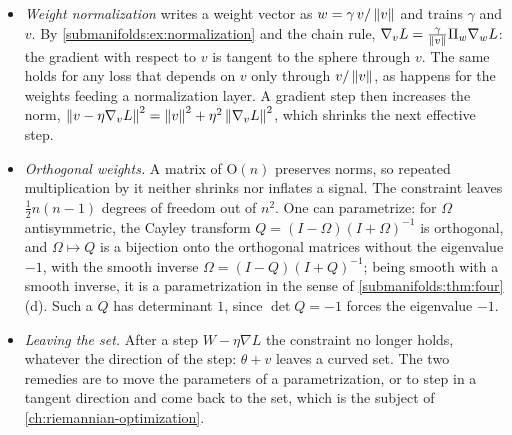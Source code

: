 \begin{notechapter}
\begin{mlthread}
\begin{itemize}[nosep]
  \item \emph{Weight normalization} writes a weight vector as
        $w = \gamma\,v/\left\|v\right\|$ and trains $\gamma$ and $v$. By
        \cref{submanifolds:ex:normalization} and the chain rule,
        $\nabla_vL = \frac\gamma{\left\|v\right\|}\Pi_w\nabla_wL$: the gradient
        with respect to $v$ is tangent to the sphere through $v$. The
        same holds for any loss that depends on $v$ only through
        $v/\left\|v\right\|$, as happens for the weights feeding a normalization
        layer. A gradient step then increases the norm,
        $\left\|v - \eta\nabla_vL\right\|^2 = \left\|v\right\|^2 + \eta^2\left\|\nabla_vL\right\|^2$,
        which shrinks the next effective step.
  \item \emph{Orthogonal weights.} A matrix of $\mathrm O(n)$ preserves
        norms, so repeated multiplication by it neither shrinks nor
        inflates a signal. The constraint leaves $\frac12n(n - 1)$
        degrees of freedom out of $n^2$. One can parametrize: for
        $\Omega$ antisymmetric, the Cayley transform
        $Q = (I - \Omega)(I + \Omega)^{-1}$ is orthogonal, and
        $\Omega\mapsto Q$ is a bijection onto the orthogonal matrices
        without the eigenvalue $-1$, with the smooth inverse
        $\Omega = (I - Q)(I + Q)^{-1}$; being smooth with a smooth
        inverse, it is a parametrization in the sense of
        \cref{submanifolds:thm:four}(d). Such a $Q$ has determinant
        $1$, since $\det Q = -1$ forces the eigenvalue $-1$.
  \item \emph{Leaving the set.} After a step $W - \eta\nabla L$ the
        constraint no longer holds, whatever the direction of the step:
        $\theta + v$ leaves a curved set. The two remedies are to move
        the parameters of a parametrization, or to step in a tangent
        direction and come back to the set, which is the subject of
        \cref{ch:riemannian-optimization}.
\end{itemize}
\end{mlthread}


\end{notechapter}
